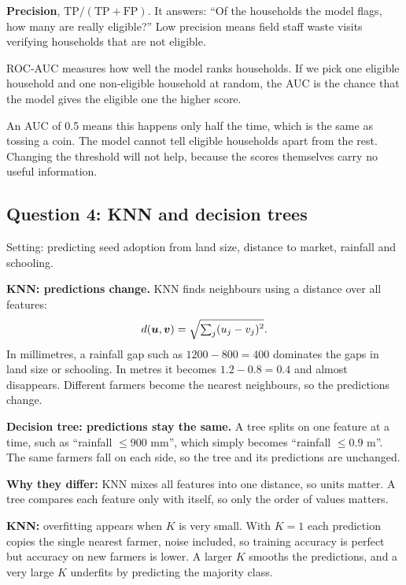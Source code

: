 \textbf{Precision}, $\text{TP}/(\text{TP}+\text{FP})$. It answers: ``Of the households the
model flags, how many are really eligible?'' Low precision means field staff waste visits
verifying households that are not eligible.

ROC-AUC measures how well the model ranks households. If we pick one eligible household and
one non-eligible household at random, the AUC is the chance that the model gives the eligible
one the higher score.

An AUC of 0.5 means this happens only half the time, which is the same as tossing a coin. The
model cannot tell eligible households apart from the rest. Changing the threshold will not
help, because the scores themselves carry no useful information.

\subsection{Question 4: KNN and decision trees}
Setting: predicting seed adoption from land size, distance to market, rainfall and schooling.

\textbf{KNN: predictions change.} KNN finds neighbours using a distance over all features:
\[
  d(\bm{u},\bm{v}) = \sqrt{\textstyle\sum_j (u_j - v_j)^2}.
\]
In millimetres, a rainfall gap such as $1200 - 800 = 400$ dominates the gaps in land size or
schooling. In metres it becomes $1.2 - 0.8 = 0.4$ and almost disappears. Different farmers
become the nearest neighbours, so the predictions change.

\textbf{Decision tree: predictions stay the same.} A tree splits on one feature at a time, such
as ``rainfall $\leq 900$ mm'', which simply becomes ``rainfall $\leq 0.9$ m''. The same farmers
fall on each side, so the tree and its predictions are unchanged.

\textbf{Why they differ:} KNN mixes all features into one distance, so units matter. A tree
compares each feature only with itself, so only the order of values matters.

\textbf{KNN:} overfitting appears when $K$ is very small. With $K = 1$ each prediction copies
the single nearest farmer, noise included, so training accuracy is perfect but accuracy on new
farmers is lower. A larger $K$ smooths the predictions, and a very large $K$ underfits by
predicting the majority class.

